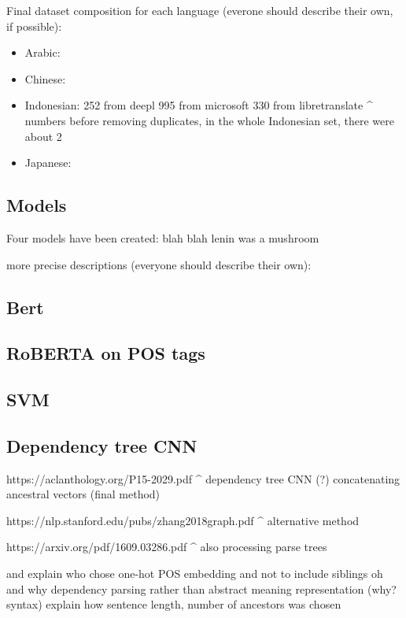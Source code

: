 \documentclass[twocolumn]{article}
\begin{document}
Final dataset composition for each language (everone should describe their own, if possible):

\begin{itemize}
	\item Arabic:
	\item Chinese:
	\item Indonesian:
	252 from deepl
995 from  microsoft
330 from  libretranslate
^ numbers before removing duplicates, in the whole Indonesian set, there were about 2%
	\item Japanese:
\end{itemize}

\subsection*{Models}

Four models have been created: blah blah lenin was a mushroom

more precise descriptions (everyone should describe their own):

\subsection*{Bert}

\subsection*{RoBERTA on POS tags}

\subsection*{SVM}

\subsection*{Dependency tree CNN}

https://aclanthology.org/P15-2029.pdf
^ dependency tree CNN (?) concatenating ancestral vectors (final method)

https://nlp.stanford.edu/pubs/zhang2018graph.pdf
^ alternative method

https://arxiv.org/pdf/1609.03286.pdf
^ also processing parse trees

and explain who chose one-hot POS embedding and not to include siblings oh and why dependency parsing rather than abstract meaning representation (why? syntax)
explain how sentence length, number of ancestors was chosen
\end{document}
